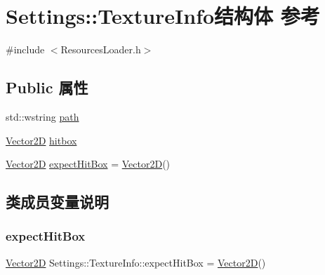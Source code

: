 \hypertarget{struct_settings_1_1_texture_info}{}\section{Settings\+:\+:Texture\+Info结构体 参考}
\label{struct_settings_1_1_texture_info}


{\ttfamily \#include $<$Resources\+Loader.\+h$>$}

\subsection*{Public 属性}
\begin{DoxyCompactItemize}
\item 
std\+::wstring \hyperlink{struct_settings_1_1_texture_info_ae8163d14505552c69b973a262fb896f6}{path}
\item 
\hyperlink{_vector2_d_8hpp_aa1f1145650f1dd9bddf7335ec6434d7c}{Vector2D} \hyperlink{struct_settings_1_1_texture_info_a5b7e1f0b9d305faa03de6d0c31cc0859}{hitbox}
\item 
\hyperlink{_vector2_d_8hpp_aa1f1145650f1dd9bddf7335ec6434d7c}{Vector2D} \hyperlink{struct_settings_1_1_texture_info_a4bec21902818b3afb2993e5d67a62dfe}{expect\+Hit\+Box} = \hyperlink{_vector2_d_8hpp_aa1f1145650f1dd9bddf7335ec6434d7c}{Vector2D}()
\end{DoxyCompactItemize}


\subsection{类成员变量说明}
\mbox{\label{struct_settings_1_1_texture_info_a4bec21902818b3afb2993e5d67a62dfe}} 
\subsubsection{\texorpdfstring{expect\+Hit\+Box}{expectHitBox}}
{\footnotesize\ttfamily \hyperlink{_vector2_d_8hpp_aa1f1145650f1dd9bddf7335ec6434d7c}{Vector2D} Settings\+::\+Texture\+Info\+::expect\+Hit\+Box = \hyperlink{_vector2_d_8hpp_aa1f1145650f1dd9bddf7335ec6434d7c}{Vector2D}()}

\mbox{\label{struct_settings_1_1_texture_info_a5b7e1f0b9d305faa03de6d0c31cc0859}} 
